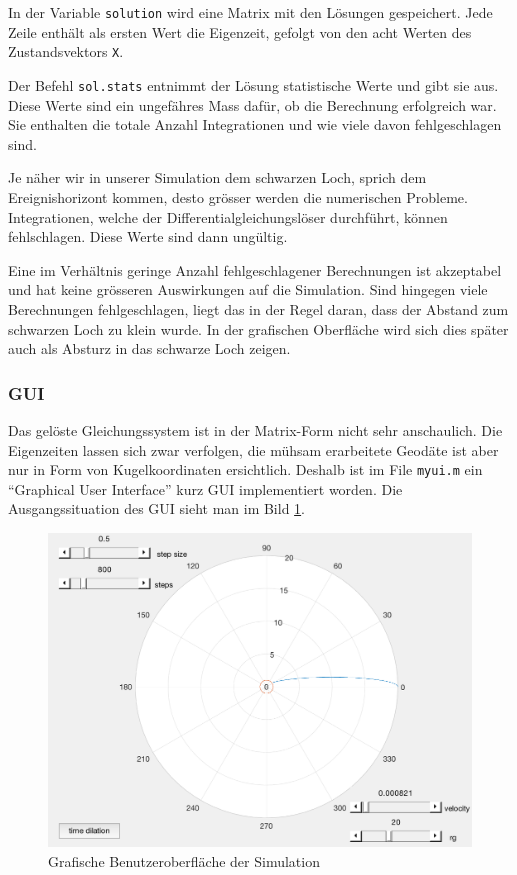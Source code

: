 \begin{refsection}
    In der Variable \texttt{solution} wird eine Matrix mit den Lösungen gespeichert. Jede Zeile enthält als ersten Wert die Eigenzeit, gefolgt von den acht Werten des Zustandsvektors \texttt{X}.
    
    Der Befehl \texttt{sol.stats} entnimmt der Lösung statistische Werte und gibt sie aus. Diese Werte sind ein ungefähres Mass dafür, ob die Berechnung erfolgreich war. Sie enthalten die totale Anzahl Integrationen und wie viele davon fehlgeschlagen sind.
    
    Je näher wir in unserer Simulation dem schwarzen Loch, sprich dem Ereignishorizont kommen, desto grösser werden die numerischen Probleme. Integrationen, welche der Differentialgleichungslöser durchführt, können fehlschlagen. Diese Werte sind dann ungültig.
    
    Eine im Verhältnis geringe Anzahl fehlgeschlagener Berechnungen ist akzeptabel und hat keine grösseren Auswirkungen auf die Simulation. Sind hingegen viele Berechnungen fehlgeschlagen, liegt das in der Regel daran, dass der Abstand zum schwarzen Loch zu klein wurde. In der grafischen Oberfläche wird sich dies später auch als Absturz in das schwarze Loch zeigen.
    
    \subsubsection{GUI}
    Das gelöste Gleichungssystem ist in der Matrix-Form nicht sehr anschaulich. Die Eigenzeiten lassen sich zwar verfolgen, die mühsam erarbeitete Geodäte ist aber nur in Form von Kugelkoordinaten ersichtlich. Deshalb ist im File \texttt{myui.m} ein ``Graphical User Interface'' kurz GUI implementiert worden. Die Ausgangssituation des GUI sieht man im Bild \ref{skript:zeitreisen:fig:gui}.
%
%
    \begin{figure}
        \centering
        \includegraphics[width=12cm]{zeitreisen/gui.png}
        \caption{Grafische Benutzeroberfläche der Simulation}
        \label{skript:zeitreisen:fig:gui} 
    \end{figure}
    

\end{refsection}
